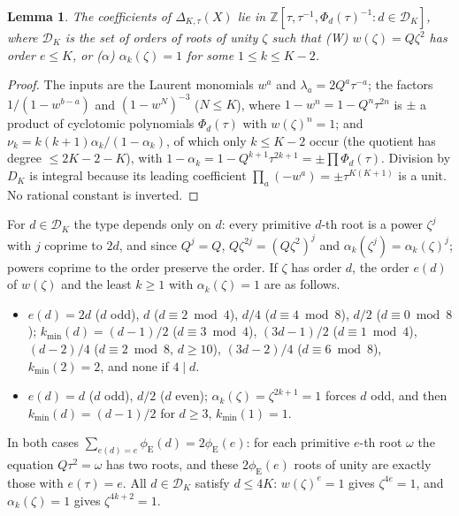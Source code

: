 \documentclass[11pt]{amsart}
\newtheorem{lemma}[theorem]{Lemma}
\theoremstyle{definition}
\theoremstyle{remark}
\numberwithin{equation}{section}
\newcommand{\ZZ}{\mathbb{Z}}
\newcommand{\cD}{\mathcal{D}}
\newcommand{\eu}{\phi_{\mathrm E}}
\begin{document}
\begin{lemma}\label{lem:ring}
The coefficients of $\Delta_{K,\tau}(X)$ lie in $\ZZ[\tau,\tau^{-1},\Phi_d(\tau)^{-1}:d\in\cD_K]$, where $\cD_K$ is
the set of orders of roots of unity $\zeta$ such that
\textup{(W)} $w(\zeta)=Q\zeta^2$ has order $e\le K$, or \textup{($\alpha$)} $\alpha_k(\zeta)=1$ for some $1\le k\le K-2$.
\end{lemma}
\begin{proof}
The inputs are the Laurent monomials $w^a$ and $\lambda_a=2Q^a\tau^{-a}$; the factors $1/(1-w^{b-a})$ and
$(1-w^N)^{-3}$ ($N\le K$), where $1-w^n=1-Q^n\tau^{2n}$ is $\pm$ a product of cyclotomic polynomials $\Phi_d(\tau)$ with
$w(\zeta)^n=1$; and $\nu_k=k(k+1)\alpha_k/(1-\alpha_k)$, of which only $k\le K-2$ occur (the quotient has degree
$\le 2K-2-K$), with $1-\alpha_k=1-Q^{k+1}\tau^{2k+1}=\pm\prod\Phi_d(\tau)$. Division by $D_K$ is integral because its
leading coefficient $\prod_a(-w^a)=\pm\tau^{K(K+1)}$ is a unit. No rational constant is inverted.
\end{proof}

For $d\in\cD_K$ the type depends only on $d$: every primitive $d$-th root is a power $\zeta^j$ with $j$ coprime to $2d$,
and since $Q^j=Q$, $Q\zeta^{2j}=(Q\zeta^2)^j$ and $\alpha_k(\zeta^j)=\alpha_k(\zeta)^j$; powers coprime to the order
preserve the order. If $\zeta$ has order $d$, the order $e(d)$ of $w(\zeta)$ and the least $k\ge1$ with
$\alpha_k(\zeta)=1$ are as follows.
\begin{itemize}
\item[$Q=-1$:] $e(d)=2d$ ($d$ odd), $d$ ($d\equiv2\bmod4$), $d/4$ ($d\equiv4\bmod8$), $d/2$ ($d\equiv0\bmod8$);
$k_{\min}(d)=(d-1)/2$ ($d\equiv3\bmod4$), $(3d-1)/2$ ($d\equiv1\bmod4$), $(d-2)/4$ ($d\equiv2\bmod8$, $d\ge10$),
$(3d-2)/4$ ($d\equiv6\bmod8$), $k_{\min}(2)=2$, and none if $4\mid d$.
\item[$Q=1$:] $e(d)=d$ ($d$ odd), $d/2$ ($d$ even); $\alpha_k(\zeta)=\zeta^{2k+1}=1$ forces $d$ odd, and then
$k_{\min}(d)=(d-1)/2$ for $d\ge3$, $k_{\min}(1)=1$.
\end{itemize}
In both cases $\sum_{e(d)=e}\eu(d)=2\eu(e)$: for each primitive $e$-th root $\omega$ the equation $Q\tau^2=\omega$ has two
roots, and these $2\eu(e)$ roots of unity are exactly those with $e(\tau)=e$. All $d\in\cD_K$ satisfy $d\le4K$:
$w(\zeta)^e=1$ gives $\zeta^{4e}=1$, and $\alpha_k(\zeta)=1$ gives $\zeta^{4k+2}=1$.
\end{document}

